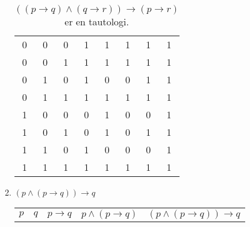 \documentclass[a4paper, 12pt]{article}  %
\newcommand{\rarr}{\rightarrow}
\begin{document}
\begin{enumerate}
\begin{enumerate}
\begin{table}[h]
\begin{center}
\begin{tabular}{|c|c|c|c|c|c|c|c|}
                                \hline
                                0   & 0   & 0   & 1           & 1           & 1                               & 1           & 1                                                   \\
                                0   & 0   & 1   & 1           & 1           & 1                               & 1           & 1                                                   \\
                                0   & 1   & 0   & 1           & 0           & 0                               & 1           & 1                                                   \\
                                0   & 1   & 1   & 1           & 1           & 1                               & 1           & 1                                                   \\
                                1   & 0   & 0   & 0           & 1           & 0                               & 0           & 1                                                   \\
                                1   & 0   & 1   & 0           & 1           & 0                               & 1           & 1                                                   \\
                                1   & 1   & 0   & 1           & 0           & 0                               & 0           & 1                                                   \\
                                1   & 1   & 1   & 1           & 1           & 1                               & 1           & 1                                                   \\
                                \hline
                            \end{tabular}
                            \caption*{$((p \rarr q) \land (q \rarr r)) \rarr (p \rarr r)$ er en tautologi.}
                        \end{center}
                    \end{table}
              \item $(p \land (p \rarr q)) \rarr q$
                    \begin{table}[h]
                        \begin{center}
                            \begin{tabular}{|c|c|c|c|c|}
                                \hline
                                $p$ & $q$ & $p \rarr q$ & $p \land (p \rarr q)$ & $(p \land (p \rarr q)) \rarr q$ \\

\end{tabular}
\end{center}
\end{table}
\end{enumerate}
\end{enumerate}
\end{document}
